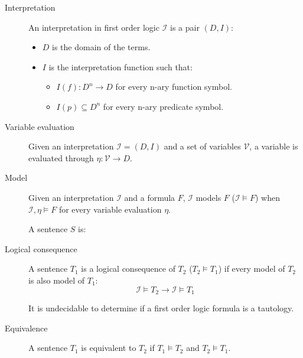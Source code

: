 \begin{description}
    \item[Interpretation] 
        An interpretation in first order logic $\mathcal{I}$ is a pair $(D, I)$:
        \begin{itemize}
            \item $D$ is the domain of the terms.
            \item $I$ is the interpretation function such that:
            \begin{itemize}
                \item $I(f): D^n \rightarrow D$ for every n-ary function symbol.
                \item $I(p) \subseteq D^n$ for every n-ary predicate symbol.
            \end{itemize}
        \end{itemize}

    \item[Variable evaluation] 
        Given an interpretation $\mathcal{I} = (D, I)$ and a set of variables $\mathcal{V}$,
        a variable is evaluated through $\eta: \mathcal{V} \rightarrow D$.

    \item[Model] 
        Given an interpretation $\mathcal{I}$ and a formula $F$,
        $\mathcal{I}$ models $F$ ($\mathcal{I} \models F$) 
        when $\mathcal{I}, \eta \models F$ for every variable evaluation $\eta$.

        A sentence $S$ is:

    \item[Logical consequence] 
        A sentence $T_1$ is a logical consequence of $T_2$ ($T_2 \models T_1$) if
        every model of $T_2$ is also model of $T_1$:
        \[ \mathcal{I} \models T_2 \rightarrow \mathcal{I} \models T_1 \]

        \begin{theorem}
            It is undecidable to determine if a first order logic formula is a tautology.
        \end{theorem}

    \item[Equivalence] 
        A sentence $T_1$ is equivalent to $T_2$ if $T_1 \models T_2$ and $T_2 \models T_1$.
\end{description}


